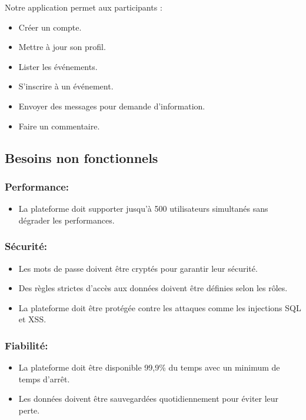 Notre application permet aux participants :
\begin{itemize}
    \item Créer un compte.
    \item Mettre à jour son profil.
    \item Lister les événements.
    \item S’inscrire à un événement.
    \item Envoyer des messages pour demande d'information.
    \item Faire un commentaire.
\end{itemize}

\subsection{Besoins non fonctionnels}

\subsubsection*{Performance:}
\begin{itemize}
    \item La plateforme doit supporter jusqu’à 500 utilisateurs simultanés sans dégrader les performances.
\end{itemize}

\subsubsection*{Sécurité:}
\begin{itemize}
    \item Les mots de passe doivent être cryptés pour garantir leur sécurité.
    \item Des règles strictes d’accès aux données doivent être définies selon les rôles.
    \item La plateforme doit être protégée contre les attaques comme les injections SQL et XSS.
\end{itemize}

\subsubsection*{Fiabilité:}
\begin{itemize}
    \item La plateforme doit être disponible 99,9\% du temps avec un minimum de temps d’arrêt.
    \item Les données doivent être sauvegardées quotidiennement pour éviter leur perte.
\end{itemize}

